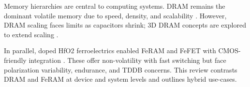 Memory hierarchies are central to computing systems. DRAM remains the dominant volatile memory due to speed, density, and scalability \cite{choi2022,kim2021_dram}. However, DRAM scaling faces limits as capacitors shrink; 3D DRAM concepts are explored to extend scaling \cite{iedm2023_dram}.

In parallel, doped HfO2 ferroelectrics enabled FeRAM and FeFET with CMOS-friendly integration \cite{boscke2011,mueller2012}. These offer non-volatility with fast switching but face polarization variability, endurance, and TDDB concerns. This review contrasts DRAM and FeRAM at device and system levels and outlines hybrid use-cases.
